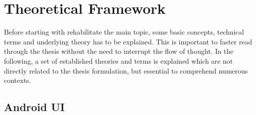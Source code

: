 \chapter{Theoretical Framework}
\label{ch:theoretical-framework}

Before starting with rehabilitate the main topic, some basic concepts, technical terms and underlying theory has to be explained.
This is important to faster read through the thesis without the need to interrupt the flow of thought.
In the following, a set of established theories and terms is explained which are not directly related to the thesis formulation, but essential to comprehend numerous contexts.

\section{Android UI}
\label{sec:android-ui}


